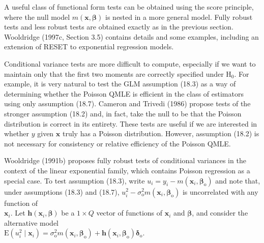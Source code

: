 \documentclass[10pt]{article}
\begin{document}
A useful class of functional form tests can be obtained using the score principle, where the null model $m(\mathbf{x}, \boldsymbol{\beta})$ is nested in a more general model. Fully robust tests and less robust tests are obtained exactly as in the previous section. Wooldridge (1997c, Section 3.5) contains details and some examples, including an extension of RESET to exponential regression models.

Conditional variance tests are more difficult to compute, especially if we want to maintain only that the first two moments are correctly specified under $\mathrm{H}_{0}$. For example, it is very natural to test the GLM assumption (18.3) as a way of determining whether the Poisson QMLE is efficient in the class of estimators using only assumption (18.7). Cameron and Trivedi (1986) propose tests of the stronger assumption (18.2) and, in fact, take the null to be that the Poisson distribution is correct in its entirety. These tests are useful if we are interested in whether $y$ given $\mathbf{x}$ truly has a Poisson distribution. However, assumption (18.2) is not necessary for consistency or relative efficiency of the Poisson QMLE.

Wooldridge (1991b) proposes fully robust tests of conditional variances in the context of the linear exponential family, which contains Poisson regression as a special case. To test assumption (18.3), write $u_{i}=y_{i}-m\left(\mathbf{x}_{i}, \boldsymbol{\beta}_{\mathrm{o}}\right)$ and note that, under assumptions (18.3) and (18.7), $u_{i}^{2}-\sigma_{\mathrm{o}}^{2} m\left(\mathbf{x}_{i}, \boldsymbol{\beta}_{\mathrm{o}}\right)$ is uncorrelated with any function of\\
$\mathbf{x}_{i}$. Let $\mathbf{h}\left(\mathbf{x}_{i}, \boldsymbol{\beta}\right)$ be a $1 \times Q$ vector of functions of $\mathbf{x}_{i}$ and $\boldsymbol{\beta}$, and consider the alternative model\\
$\mathrm{E}\left(u_{i}^{2} \mid \mathbf{x}_{i}\right)=\sigma_{\mathrm{o}}^{2} m\left(\mathbf{x}_{i}, \boldsymbol{\beta}_{\mathrm{o}}\right)+\mathbf{h}\left(\mathbf{x}_{i}, \boldsymbol{\beta}_{\mathrm{o}}\right) \boldsymbol{\delta}_{\mathrm{o}}$.
\end{document}
